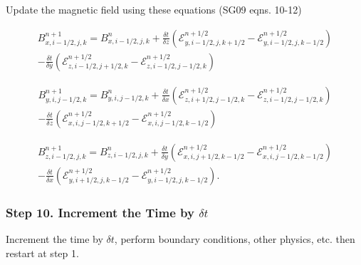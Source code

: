 Update the magnetic field using these equations (SG09 eqns. 10-12)

\begin{equation}
    \begin{aligned}
        B^{n+1}_{x,i-1/2,j,k} = B^{n}_{x,i-1/2,j,k}
        + \frac{\delta t}{\delta z} \left( \mathcal{E}^{n+1/2}_{y,i-1/2,j,k+1/2} - \mathcal{E}^{n+1/2}_{y,i-1/2,j,k-1/2} \right) \\
        - \frac{\delta t}{\delta y} \left( \mathcal{E}^{n+1/2}_{z,i-1/2,j+1/2,k} - \mathcal{E}^{n+1/2}_{z,i-1/2,j-1/2,k} \right)
    \end{aligned}
\end{equation}

\begin{equation}
    \begin{aligned}
        B^{n+1}_{y,i,j-1/2,k} = B^{n}_{y,i,j-1/2,k}
        + \frac{\delta t}{\delta x} \left( \mathcal{E}^{n+1/2}_{z,i+1/2,j-1/2,k} - \mathcal{E}^{n+1/2}_{z,i-1/2,j-1/2,k} \right) \\
        - \frac{\delta t}{\delta z} \left( \mathcal{E}^{n+1/2}_{x,i,j-1/2,k+1/2} - \mathcal{E}^{n+1/2}_{x,i,j-1/2,k-1/2} \right)
    \end{aligned}
\end{equation}

\begin{equation}
    \begin{aligned}
        B^{n+1}_{z,i-1/2,j,k} = B^{n}_{z,i-1/2,j,k}
        + \frac{\delta t}{\delta y} \left( \mathcal{E}^{n+1/2}_{x,i,j+1/2,k-1/2} - \mathcal{E}^{n+1/2}_{x,i,j-1/2,k-1/2} \right) \\
        - \frac{\delta t}{\delta x} \left( \mathcal{E}^{n+1/2}_{y,i+1/2,j,k-1/2} - \mathcal{E}^{n+1/2}_{y,i-1/2,j,k-1/2} \right).
    \end{aligned}
\end{equation}

\subsubsection{Step 10. Increment the Time by \texorpdfstring{$\delta t$}{dt}}
\label{vlct:increment-time}

Increment the time by $\delta t$, perform boundary conditions, other physics, etc. then restart at step 1.
